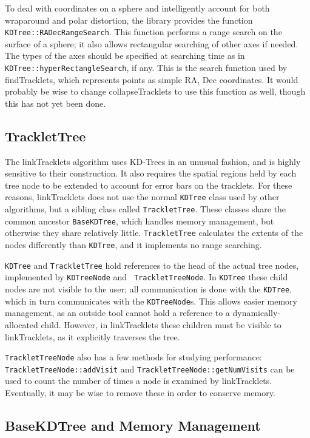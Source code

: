 To deal with coordinates on a sphere and intelligently account for
both wraparound and polar distortion, the library provides the
function {\tt KDTree::RADecRangeSearch}.  This function performs a
range search on the surface of a sphere; it also allows rectangular
searching of other axes if needed.  The types of the axes should be
specified at searching time as in {\tt KDTree::hyperRectangleSearch},
if any.  This is the search function used by findTracklets, which
represents points as simple RA, Dec coordinates.  It would probably be
wise to change collapseTracklets to use this function as well, though
this has not yet been done.


\subsection{TrackletTree}

The linkTracklets algorithm uses KD-Trees in an unusual fashion, and
is highly sensitive to their construction.  It also requires the
spatial regions held by each tree node to be extended to account for
error bars on the tracklets.  For these reasons, linkTracklets does
not use the normal {\tt KDTree} class used by other algorithms, but a
sibling class called {\tt TrackletTree}.  These classes share the
common ancestor {\tt BaseKDTree}, which handles memory management, but
otherwise they share relatively little.  {\tt TrackletTree} calculates
the extents of the nodes differently than {\tt KDTree}, and it
implements no range searching.  

{\tt KDTree} and {\tt TrackletTree} hold references to the head of the
actual tree nodes, implemented by {\tt KDTreeNode} and {\tt
TrackletTreeNode}.  In {\tt KDTree} these child nodes are not visible
to the user; all communication is done with the {\tt KDTree}, which in
turn communicates with the {\tt KDTreeNode}s.  This allows easier
memory management, as an outside tool cannot hold a reference to a
dynamically-allocated child.  However, in linkTracklets these children
must be visible to linkTracklets, as it explicitly traverses the tree.  

{\tt TrackletTreeNode} also has a few methods for studying performance: \\
{\tt TrackletTreeNode::addVisit} and {\tt TrackletTreeNode::getNumVisits} can
be used to count the number of times a node is examined by
linkTracklets.  Eventually, it may be wise to remove these in order to
conserve memory.


\subsection{BaseKDTree and Memory Management}

